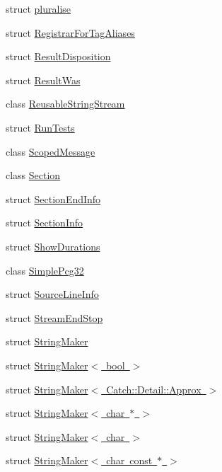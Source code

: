 \begin{DoxyCompactItemize}
struct \mbox{\hyperlink{struct_catch_1_1pluralise}{pluralise}}
\item 
struct \mbox{\hyperlink{struct_catch_1_1_registrar_for_tag_aliases}{Registrar\+For\+Tag\+Aliases}}
\item 
struct \mbox{\hyperlink{struct_catch_1_1_result_disposition}{Result\+Disposition}}
\item 
struct \mbox{\hyperlink{struct_catch_1_1_result_was}{Result\+Was}}
\item 
class \mbox{\hyperlink{class_catch_1_1_reusable_string_stream}{Reusable\+String\+Stream}}
\item 
struct \mbox{\hyperlink{struct_catch_1_1_run_tests}{Run\+Tests}}
\item 
class \mbox{\hyperlink{class_catch_1_1_scoped_message}{Scoped\+Message}}
\item 
class \mbox{\hyperlink{class_catch_1_1_section}{Section}}
\item 
struct \mbox{\hyperlink{struct_catch_1_1_section_end_info}{Section\+End\+Info}}
\item 
struct \mbox{\hyperlink{struct_catch_1_1_section_info}{Section\+Info}}
\item 
struct \mbox{\hyperlink{struct_catch_1_1_show_durations}{Show\+Durations}}
\item 
class \mbox{\hyperlink{class_catch_1_1_simple_pcg32}{Simple\+Pcg32}}
\item 
struct \mbox{\hyperlink{struct_catch_1_1_source_line_info}{Source\+Line\+Info}}
\item 
struct \mbox{\hyperlink{struct_catch_1_1_stream_end_stop}{Stream\+End\+Stop}}
\item 
struct \mbox{\hyperlink{struct_catch_1_1_string_maker}{String\+Maker}}
\item 
struct \mbox{\hyperlink{struct_catch_1_1_string_maker_3_01bool_01_4}{String\+Maker$<$ bool $>$}}
\item 
struct \mbox{\hyperlink{struct_catch_1_1_string_maker_3_01_catch_1_1_detail_1_1_approx_01_4}{String\+Maker$<$ Catch\+::\+Detail\+::\+Approx $>$}}
\item 
struct \mbox{\hyperlink{struct_catch_1_1_string_maker_3_01char_01_5_01_4}{String\+Maker$<$ char $\ast$ $>$}}
\item 
struct \mbox{\hyperlink{struct_catch_1_1_string_maker_3_01char_01_4}{String\+Maker$<$ char $>$}}
\item 
struct \mbox{\hyperlink{struct_catch_1_1_string_maker_3_01char_01const_01_5_01_4}{String\+Maker$<$ char const $\ast$ $>$}}
\item 

\end{DoxyCompactItemize}

